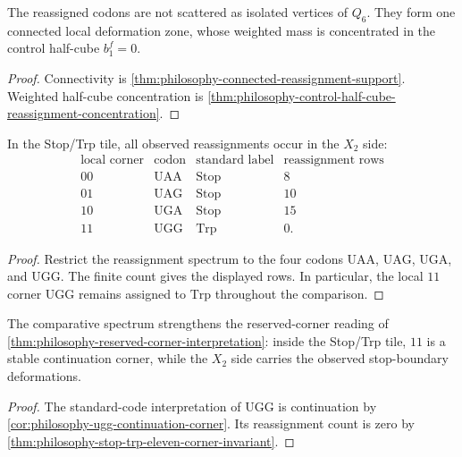 \begin{corollary}
\label{cor:philosophy-reassignment-support-connected-zone}
The reassigned codons are not scattered as isolated vertices of $Q_{6}$.
They form one connected local deformation zone, whose weighted mass is
concentrated in the control half-cube $b_{1}^{f}=0$.
\end{corollary}
\begin{proof}
Connectivity is
\autoref{thm:philosophy-connected-reassignment-support}. Weighted
half-cube concentration is
\autoref{thm:philosophy-control-half-cube-reassignment-concentration}.
\end{proof}

\begin{theorem}
\label{thm:philosophy-stop-trp-eleven-corner-invariant}
In the Stop/Trp tile, all observed reassignments occur in the
$X_{2}$ side:
$$
\begin{array}{c|c|c|r}
  \text{local corner} & \text{codon} & \text{standard label}
    & \text{reassignment rows}\\
\hline
  00 & \mathrm{UAA} & \mathrm{Stop} & 8\\
  01 & \mathrm{UAG} & \mathrm{Stop} & 10\\
  10 & \mathrm{UGA} & \mathrm{Stop} & 15\\
  11 & \mathrm{UGG} & \mathrm{Trp} & 0.
\end{array}
$$
\end{theorem}
\begin{proof}
Restrict the reassignment spectrum to the four codons
$\mathrm{UAA}$, $\mathrm{UAG}$, $\mathrm{UGA}$, and $\mathrm{UGG}$.
The finite count gives the displayed rows. In particular, the local
$11$ corner $\mathrm{UGG}$ remains assigned to $\mathrm{Trp}$ throughout
the comparison.
\end{proof}

\begin{corollary}
\label{cor:philosophy-stop-trp-eleven-continuation-not-absence}
The comparative spectrum strengthens the reserved-corner reading of
\autoref{thm:philosophy-reserved-corner-interpretation}: inside the
Stop/Trp tile, $11$ is a stable continuation corner, while the
$X_{2}$ side carries the observed stop-boundary deformations.
\end{corollary}
\begin{proof}
The standard-code interpretation of $\mathrm{UGG}$ is continuation by
\autoref{cor:philosophy-ugg-continuation-corner}. Its reassignment count
is zero by
\autoref{thm:philosophy-stop-trp-eleven-corner-invariant}.
\end{proof}

